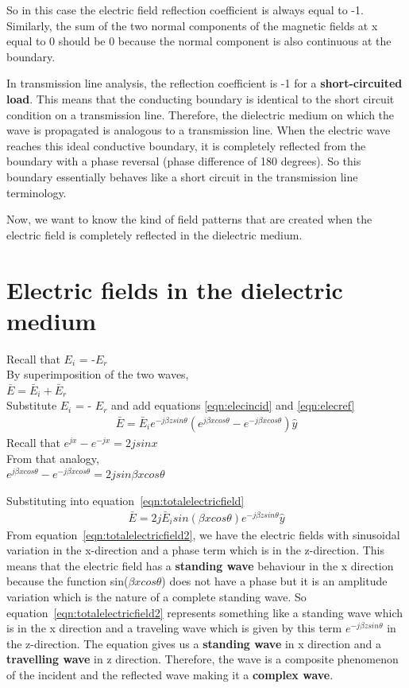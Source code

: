So in this case the electric field reflection coefficient is always equal to -1. Similarly, the sum of the two normal components of the
magnetic fields at x equal to 0 should be 0 because the normal component is also continuous at the boundary.
 
In transmission line analysis, the reflection coefficient is -1 for a \textbf{short-circuited load}. This means that the conducting boundary is identical to the short circuit condition on a transmission line. Therefore, the dielectric medium on which the wave is propagated is analogous to a transmission line. When the electric wave reaches this ideal conductive boundary, it is completely reflected from the boundary with a phase reversal (phase difference of 180 degrees). So this boundary essentially behaves like a short circuit in the transmission line terminology.

Now, we want to know the kind of field patterns that are created when the electric field is completely reflected in the dielectric medium.
 
\section{Electric fields in the dielectric medium}
Recall that $E_{i}$ = -$E_{r}$\\ 
By superimposition of the two waves,\\ 
$\bar{E}= \bar{E}_i + \bar{E}_r$\\ 
Substitute $E_i$ = - $E_r$ and add equations \eqref{eqn:elecincid} and \eqref{eqn:elecref}
\begin{align}
\bar{E}= \bar{E}_i e^{-j\beta zsin\theta} (e^{j\beta xcos\theta }- e^{-j\beta xcos\theta}) \hat{y}
\label{eqn:totalelectricfield}
\end{align}
Recall that $e^{jx} - e^{-jx} = 2jsinx$\\ 
From that analogy,\\ 
$e^{j\beta xcos\theta} - e^{-j\beta xcos\theta} = 2jsin\beta xcos\theta$

Substituting into equation~\ref{eqn:totalelectricfield}
\begin{align}
\bar{E}=2j \bar{E}_i sin(\beta xcos\theta) e^{-j\beta zsin\theta} \hat{y}
\label{eqn:totalelectricfield2}
\end{align}
From equation~\ref{eqn:totalelectricfield2}, we have the electric fields with sinusoidal variation in the x-direction and a phase term which is in the z-direction. This means that the electric field has a \textbf{standing wave} behaviour in the x direction because the function {sin({$\beta xcos\theta$})} does not have a phase but it is an amplitude variation which is the nature of a complete standing wave. So equation~\ref{eqn:totalelectricfield2} represents something like a standing wave which is in the x direction and a traveling wave which is given by this term \textbf{$e^{-j\beta zsin\theta}$} in the z-direction. The equation gives us a \textbf{standing wave} in x direction and a \textbf{travelling wave} in z direction. Therefore, the wave is a composite phenomenon of the incident and the reflected wave making it a \textbf{complex wave}.


